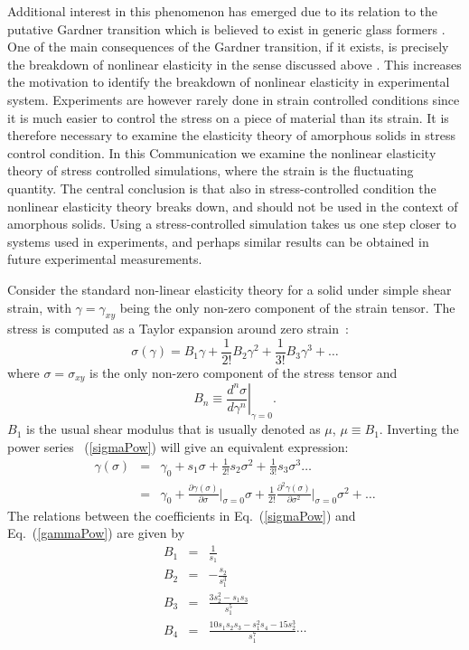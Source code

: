 \documentclass[pre,twocolumn,aps,10pt,superscriptaddress,notitlepage,nofootinbib]{revtex4-1}
\begin{document}
 Additional interest in this phenomenon has emerged due to its relation to the putative Gardner transition \cite{Ga85}
 which is believed to exist in generic glass formers \cite{12KPZF,13KPZF,fullRSB}. One of the main consequences of the Gardner
 transition, if it exists, is precisely the breakdown of nonlinear elasticity in the sense discussed above \cite{16BU}.
 This increases the motivation to identify the breakdown of nonlinear elasticity in experimental system.
 Experiments are however rarely done in strain controlled conditions since it is much easier to control the stress on a piece of material than its strain. It is therefore necessary to examine the elasticity theory of
 amorphous solids in stress control condition. In this Communication we examine the nonlinear elasticity theory of stress controlled simulations, where the strain is the fluctuating quantity. The central conclusion is that
 also in stress-controlled condition the nonlinear elasticity theory breaks down, and should not be used in the context of amorphous solids. Using a stress-controlled simulation takes us one step closer to systems used in experiments, and perhaps similar results can be obtained in future experimental measurements.

Consider the standard non-linear elasticity theory for a solid under simple shear strain, with $\gamma = \gamma_{xy}$ being the only non-zero component of the strain tensor. The stress is computed as a Taylor expansion around zero strain~\cite{LandauElasticity}:
\begin{equation}
 \sigma(\gamma) = B_1\gamma + \frac{1}{2!}B_2\gamma^2 + \frac{1}{3!}B_3\gamma^3 + \dots
 \label{sigmaPow}
\end{equation}
where $\sigma = \sigma_{xy}$ is the only non-zero component of the stress tensor and
\begin{equation}
 B_n \equiv \left.\frac{d^n\sigma}{d\gamma^n}\right|_{\gamma=0}.
\end{equation}
$B_1$ is the usual shear modulus that is usually denoted as $\mu$, $\mu\equiv B_1$.  Inverting the power series ~(\ref{sigmaPow})  will give an equivalent expression:
\begin{eqnarray}
\gamma(\sigma)&=&\gamma_0 +s_1\sigma+\frac{1}{2!}s_2\sigma^2+\frac{1}{3!}s_3\sigma^3\ldots\nonumber\\
&=&\gamma_0 +\frac{\partial \gamma(\sigma)}{\partial \sigma}\Big|_{\sigma=0}\sigma+\frac{1}{2!}\frac{\partial^2 \gamma(\sigma)}{\partial \sigma^2}\Big|_{\sigma=0}\sigma^2+\ldots
\label{gammaPow}
\end{eqnarray}
The relations between the coefficients in Eq.~(\ref{sigmaPow}) and Eq.~(\ref{gammaPow}) are given by \cite{Abramowitz}
\begin{eqnarray}
B_1&=&\frac{1}{s_1}\nonumber\\
B_2&=&-\frac{s_2}{s_1^3}\nonumber\\
B_3&=&\frac{3s_2^2-s_1 s_3}{s_1^5}\nonumber\\
B_4&=&\frac{10s_1 s_2 s_3-s_1^2s_4-15s_2^3}{s_1^7} \cdots \nonumber
\label{coef}
\end{eqnarray}
\end{document}
